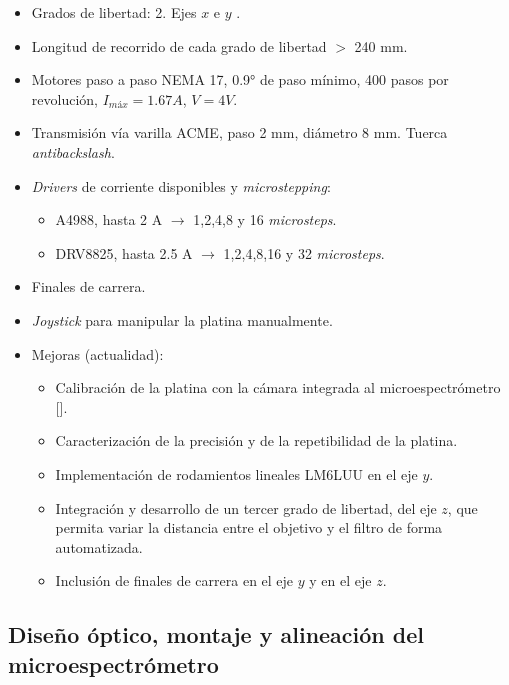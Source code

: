     \begin{itemize}
        \item Grados de libertad: 2. Ejes $\textit{x}$ e $\textit{y}$  .
        \item Longitud de recorrido de cada grado de libertad $>$ 240 mm.
        \item Motores paso a paso NEMA 17, 0.9° de paso mínimo, 400 pasos por revolución, $I_{máx} = 1.67 A$, $V = 4V$.
        \item Transmisión vía varilla ACME, paso 2 mm, diámetro 8 mm. Tuerca \textit{antibackslash}.
        \item \textit{Drivers} de corriente disponibles y \textit{microstepping}:
\begin{itemize}
\item A4988, hasta 2 A $\xrightarrow{}$ 1,2,4,8 y 16  \textit{microsteps}.
\item DRV8825, hasta 2.5 A $\xrightarrow{}$ 1,2,4,8,16 y 32 \textit{microsteps}.
\end{itemize}
\item Finales de carrera.
\item \textit{Joystick} para manipular la platina manualmente.
    \item Mejoras (actualidad):
    \begin{itemize}
 	\item Calibración de la platina con la cámara integrada al microespectrómetro [\cite{schaa}].
 	\item Caracterización de la precisión y de la repetibilidad de la platina.
        \item Implementación de rodamientos lineales LM6LUU en el eje $\textit{y}$.
        \item Integración y desarrollo de un tercer grado de libertad, del eje $\textit{z}$, que permita variar la distancia entre el objetivo y el filtro de forma automatizada.
        \item Inclusión de finales de carrera en el eje $\textit{y}$ y en el eje $\textit{z}$. 
        \end{itemize}
\end{itemize}
\newpage



\singlespacing
\subsection{Diseño óptico, montaje y alineación del microespectrómetro}
\label{sec:montalin}

